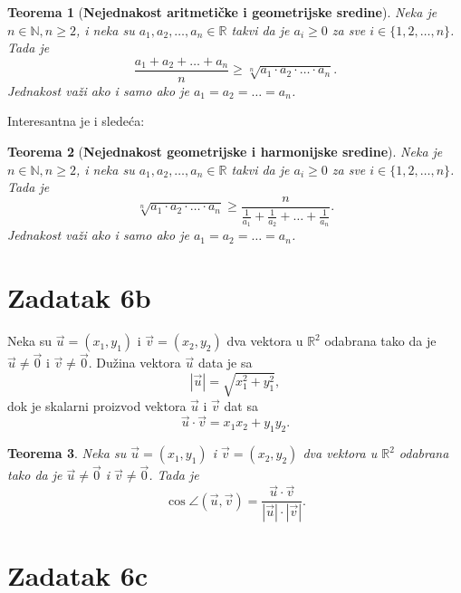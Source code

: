 \documentclass[12pt, a4paper]{article}
\newtheorem*{theorem*}{Teorema}
\begin{document}
    \begin{theorem*}[\textbf{Nejednakost aritmeti\v{c}ke i geometrijske sredine}]
        Neka je $n \in \mathbb{N}, n \geq 2$, i neka su $a_1, a_2, \ldots, a_n \in \mathbb{R}$ takvi da je 
        $a_i \geq 0$ za sve $i \in \{1, 2, \ldots, n\}$. Tada je
        \[
            \frac{a_1 + a_2 + \ldots + a_n}{n} \geq \sqrt[n]{a_1 \cdot a_2 \cdot \ldots \cdot a_n}.
        \]
        Jednakost va\v{z}i ako i samo ako je $a_1 = a_2 = \ldots = a_n$.
    \end{theorem*}

    Interesantna je i slede\'ca:

    \begin{theorem*}[\textbf{Nejednakost geometrijske i harmonijske sredine}]
        Neka je $n \in \mathbb{N}, n \geq 2$, i neka su $a_1, a_2, \ldots, a_n \in \mathbb{R}$ takvi da je 
        $a_i \geq 0$ za sve $i \in \{1, 2, \ldots, n\}$. Tada je
        \[
            \sqrt[n]{a_1 \cdot a_2 \cdot \ldots \cdot a_n} 
            \geq 
            \frac{n}{\frac{1}{a_1}+\frac{1}{a_2}+\ldots+\frac{1}{a_n}}.
        \]
        Jednakost va\v{z}i ako i samo ako je $a_1 = a_2 = \ldots = a_n$.
    \end{theorem*}

    \section*{Zadatak 6b}

    Neka su $\vec{u} =(x_1, y_1)$ i $\vec{v} = (x_2, y_2)$ dva vektora u $\mathbb{R}^2$ odabrana tako da
    je $\vec{u} \neq \vec{0}$ i $\vec{v} \neq \vec{0}$. Du\v{z}ina vektora $\vec{u}$ data je sa
    \[
        |\vec{u}| = \sqrt{x_1^2 + y_1^2},
    \]
    dok je skalarni proizvod vektora $\vec{u}$ i $\vec{v}$ dat sa
    \[
        \vec{u} \cdot \vec{v} = x_1x_2 + y_1y_2.
    \]

    \begin{theorem*}
        Neka su $\vec{u} = (x_1, y_1)$ i $\vec{v} = (x_2, y_2)$ dva vektora u $\mathbb{R}^2$ odabrana
        tako da je $\vec{u} \neq \vec{0}$ i $\vec{v} \neq \vec{0}$. Tada je
        \[
            \cos \angle (\vec{u}, \vec{v}) = \frac{\vec{u} \cdot \vec{v}}{|\vec{u}| \cdot |\vec{v}|}.
        \]
    \end{theorem*}


    \section{Zadatak 6c}
\end{document}
